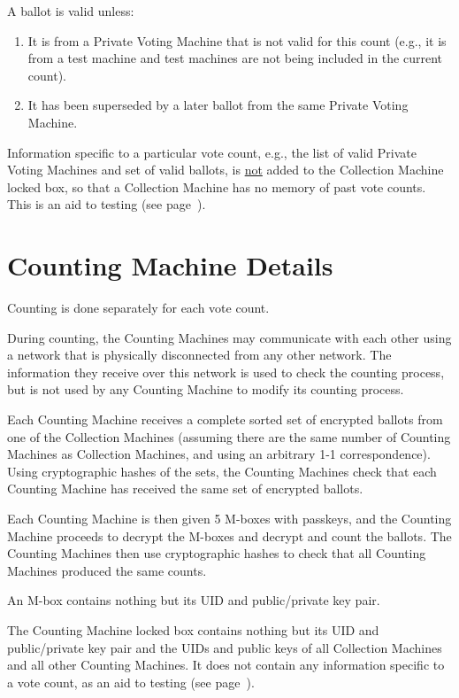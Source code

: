 \documentclass[12pt]{article}
\newcommand{\pagref}[1]{(see page~\pageref{#1})}
\begin{document}
A ballot is valid unless:

\begin{enumerate}
\item It is from a Private Voting Machine that is not valid for
this count (e.g., it is from a test machine and test machines
are not being included in the current count).
\item It has been superseded by a later ballot from the same
Private Voting Machine.
\end{enumerate}

Information specific to a particular vote count, e.g., the
list of valid Private Voting Machines and set of valid ballots,
is \underline{not} added to the Collection Machine locked box,
so that a Collection Machine has no memory of past vote counts.
This is an aid to testing \pagref{TESTING}.

\section{Counting Machine Details}

Counting is done separately for each vote count.

During counting, the Counting Machines may communicate with
each other using a network that is physically disconnected
from any other network.  The information they receive over this
network is used to check the counting process, but is not used
by any Counting Machine to modify its counting process.

Each Counting Machine receives a complete sorted set of encrypted ballots
from one of the Collection Machines (assuming there are the same
number of Counting Machines as Collection Machines, and using an
arbitrary 1-1 correspondence).
Using cryptographic hashes of the sets, the Counting
Machines check that each Counting Machine has received the same set
of encrypted ballots.

Each Counting Machine is then given 5 M-boxes with passkeys,
and the Counting Machine proceeds to decrypt the M-boxes and
decrypt and count the ballots.  The Counting Machines then use
cryptographic hashes to check
that all Counting Machines produced the same counts.

An M-box contains nothing but its UID and public/private key pair.

The Counting Machine locked box contains nothing but its
UID and public/private key pair and the UIDs
and public keys of all Collection Machines and all other Counting Machines.
It does not contain any information specific to a vote count,
as an aid to testing \pagref{TESTING}.
\end{document}
